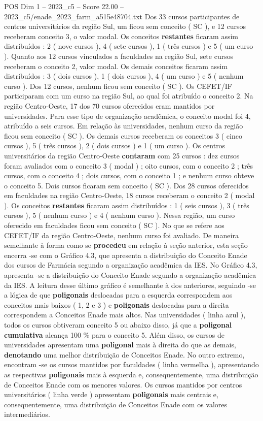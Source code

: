 \begin{textsample}{POS Dim 1 – 2023\_c5 – Score 22.00 – 2023\_c5/enade\_2023\_farm\_a515e48704.txt}
Dos 33 cursos participantes de centros universitários da região Sul, um ficou sem conceito ( SC ), e 12 cursos receberam conceito 3, o valor modal.
Os conceitos \textbf{restantes} ficaram assim distribuídos : 2 ( nove cursos ), 4 ( sete cursos ), 1 ( três cursos ) e 5 ( um curso ).
Quanto aos 12 cursos vinculados a faculdades na região Sul, sete cursos receberam o conceito 2, valor modal.
Os demais conceitos ficaram assim distribuídos : 3 ( dois cursos ), 1 ( dois cursos ), 4 ( um curso ) e 5 ( nenhum curso ).
Dos 12 cursos, nenhum ficou sem conceito ( SC ).
Os CEFET/IF participaram com um curso na região Sul, ao qual foi atribuído o conceito 2.
Na região Centro-Oeste, 17 dos 70 cursos oferecidos eram mantidos por universidades.
Para esse tipo de organização acadêmica, o conceito modal foi 4, atribuído a seis cursos.
Em relação às universidades, nenhum curso da região ficou sem conceito ( SC ).
Os demais cursos receberam os conceitos 3 ( cinco cursos ), 5 ( três cursos ), 2 ( dois cursos ) e 1 ( um curso ).
Os centros universitários da região Centro-Oeste \textbf{contaram} com 25 cursos : dez cursos foram avaliados com o conceito 3 ( modal ) ; oito cursos, com o conceito 2 ; três cursos, com o conceito 4 ; dois cursos, com o conceito 1 ; e nenhum curso obteve o conceito 5.
Dois cursos ficaram sem conceito ( SC ).
Dos 28 cursos oferecidos em faculdades na região Centro-Oeste, 18 cursos receberam o conceito 2 ( modal ).
Os conceitos \textbf{restantes} ficaram assim distribuídos : 1 ( seis cursos ), 3 ( três cursos ), 5 ( nenhum curso ) e 4 ( nenhum curso ).
Nessa região, um curso oferecido em faculdades ficou sem conceito ( SC ).
No que se refere aos CEFET/IF da região Centro-Oeste, nenhum curso foi avaliado.
De maneira semelhante à forma como se \textbf{procedeu} em relação à seção anterior, esta seção encerra -se com o Gráfico 4.3, que apresenta a distribuição do Conceito Enade dos cursos de Farmácia segundo a organização acadêmica da IES.
No Gráfico 4.3, apresenta -se a distribuição do Conceito Enade segundo a organização acadêmica da IES.
A leitura desse último gráfico é semelhante à dos anteriores, seguindo -se a lógica de que \textbf{poligonais} deslocadas para a esquerda correspondem aos conceitos mais baixos ( 1, 2 e 3 ) e \textbf{poligonais} deslocadas para a direita correspondem a Conceitos Enade mais altos.
Nas universidades ( linha azul ), todos os cursos obtiveram conceito 5 ou abaixo disso, já que a \textbf{poligonal} \textbf{cumulativa} alcança 100 \% para o conceito 5.
Além disso, os cursos de universidades apresentam uma \textbf{poligonal} mais à direita do que as demais, \textbf{denotando} uma melhor distribuição de Conceitos Enade.
No outro extremo, encontram -se os cursos mantidos por faculdades ( linha vermelha ), apresentando as respectivas \textbf{poligonais} mais à esquerda e, consequentemente, uma distribuição de Conceitos Enade com os menores valores.
Os cursos mantidos por centros universitários ( linha verde ) apresentam \textbf{poligonais} mais centrais e, consequentemente, uma distribuição de Conceitos Enade com os valores intermediários.


\end{textsample}
